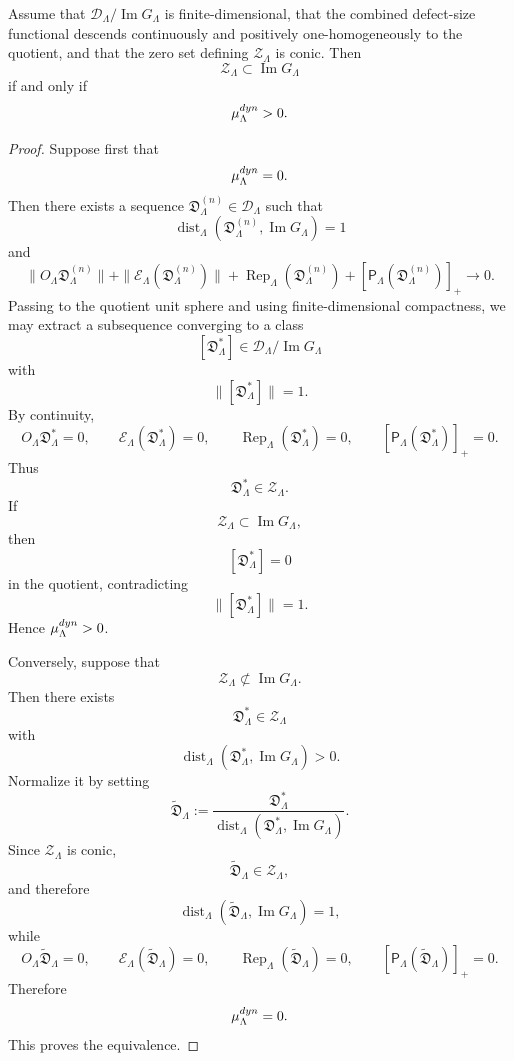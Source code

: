 \documentclass[10pt,a4paper]{amsart}
\begin{document}
\begin{proposition}
\label{prop:no-phantom-gap-equivalence}
Assume that \(\mathcal D_\Lambda/\operatorname{Im}G_\Lambda\) is
finite-dimensional, that the combined defect-size functional descends
continuously and positively one-homogeneously to the quotient, and that the
zero set defining \(\mathcal Z_\Lambda\) is conic.  Then
\[
        \mathcal Z_\Lambda
        \subset
        \operatorname{Im}G_\Lambda
\]
if and only if
\[
        \mu_\Lambda^{\rm dyn}>0.
\]
\end{proposition}

\begin{proof}
Suppose first that
\[
        \mu_\Lambda^{\rm dyn}=0.
\]
Then there exists a sequence
\(\mathfrak D_\Lambda^{(n)}\in\mathcal D_\Lambda\) such that
\[
        \operatorname{dist}_\Lambda
        (\mathfrak D_\Lambda^{(n)},\operatorname{Im}G_\Lambda)=1
\]
and
\[
        \|O_\Lambda\mathfrak D_\Lambda^{(n)}\|
        +
        \|\mathcal E_\Lambda(\mathfrak D_\Lambda^{(n)})\|
        +
        \operatorname{Rep}_\Lambda(\mathfrak D_\Lambda^{(n)})
        +
        [\mathsf P_\Lambda(\mathfrak D_\Lambda^{(n)})]_+
        \longrightarrow 0 .
\]
Passing to the quotient unit sphere and using finite-dimensional
compactness, we may extract a subsequence converging to a class
\[
        [\mathfrak D_\Lambda^\ast]
        \in
        \mathcal D_\Lambda/\operatorname{Im}G_\Lambda
\]
with
\[
        \|[\mathfrak D_\Lambda^\ast]\|=1.
\]
By continuity,
\[
        O_\Lambda\mathfrak D_\Lambda^\ast=0,
        \qquad
        \mathcal E_\Lambda(\mathfrak D_\Lambda^\ast)=0,
        \qquad
        \operatorname{Rep}_\Lambda(\mathfrak D_\Lambda^\ast)=0,
        \qquad
        [\mathsf P_\Lambda(\mathfrak D_\Lambda^\ast)]_+=0.
\]
Thus
\[
        \mathfrak D_\Lambda^\ast\in\mathcal Z_\Lambda.
\]
If
\[
        \mathcal Z_\Lambda\subset\operatorname{Im}G_\Lambda,
\]
then
\[
        [\mathfrak D_\Lambda^\ast]=0
\]
in the quotient, contradicting
\[
        \|[\mathfrak D_\Lambda^\ast]\|=1.
\]
Hence \(\mu_\Lambda^{\rm dyn}>0\).

Conversely, suppose that
\[
        \mathcal Z_\Lambda
        \not\subset
        \operatorname{Im}G_\Lambda.
\]
Then there exists
\[
        \mathfrak D_\Lambda^\ast\in\mathcal Z_\Lambda
\]
with
\[
        \operatorname{dist}_\Lambda
        (\mathfrak D_\Lambda^\ast,\operatorname{Im}G_\Lambda)>0.
\]
Normalize it by setting
\[
        \widetilde{\mathfrak D}_\Lambda
        :=
        \frac{\mathfrak D_\Lambda^\ast}
        {\operatorname{dist}_\Lambda
        (\mathfrak D_\Lambda^\ast,\operatorname{Im}G_\Lambda)} .
\]
Since \(\mathcal Z_\Lambda\) is conic,
\[
        \widetilde{\mathfrak D}_\Lambda\in\mathcal Z_\Lambda,
\]
and therefore
\[
        \operatorname{dist}_\Lambda
        (\widetilde{\mathfrak D}_\Lambda,\operatorname{Im}G_\Lambda)=1,
\]
while
\[
        O_\Lambda\widetilde{\mathfrak D}_\Lambda=0,
        \qquad
        \mathcal E_\Lambda(\widetilde{\mathfrak D}_\Lambda)=0,
        \qquad
        \operatorname{Rep}_\Lambda(\widetilde{\mathfrak D}_\Lambda)=0,
        \qquad
        [\mathsf P_\Lambda(\widetilde{\mathfrak D}_\Lambda)]_+=0.
\]
Therefore
\[
        \mu_\Lambda^{\rm dyn}=0.
\]
This proves the equivalence.
\end{proof}
\end{document}

